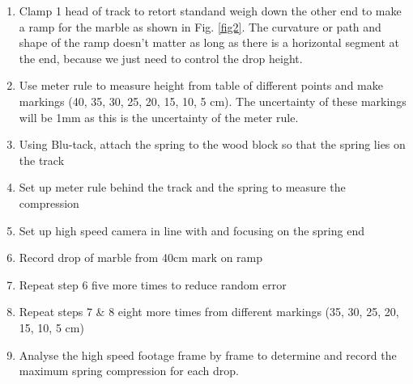 \begin{enumerate}
    \item Clamp 1 head of track to retort standand weigh down the other end to make a ramp for the marble as shown in Fig. \ref{fig2}. The curvature or path and shape of the ramp doesn't matter as long as there is a horizontal segment at the end, because we just need to control the drop height.
    \item Use meter rule to measure height from table of different points and make markings (40, 35, 30, 25, 20, 15, 10, 5 cm). The uncertainty of these markings will be 1mm as this is the uncertainty of the meter rule.
    \item Using Blu-tack, attach the spring to the wood block so that the spring lies on the track
    \item Set up meter rule behind the track and the spring to measure the compression
    \item Set up high speed camera in line with and focusing on the spring end 
    \item Record drop of marble from 40cm mark on ramp
    \item Repeat step 6 five more times to reduce random error
    \item Repeat steps 7 \& 8 eight more times from different markings (35, 30, 25, 20, 15, 10, 5 cm)
    \item Analyse the high speed footage frame by frame to determine and record the maximum spring compression for each drop.
\end{enumerate}